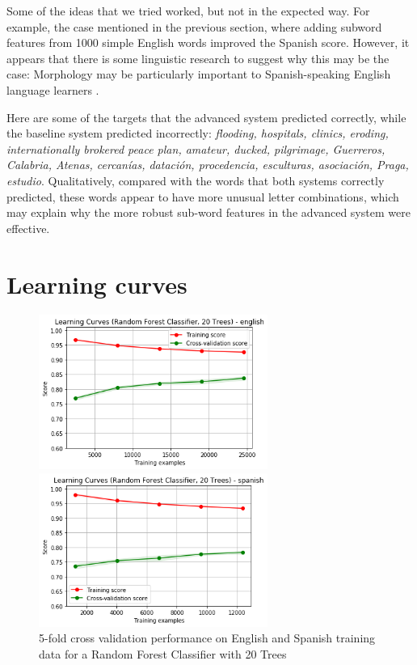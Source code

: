 \documentclass[11pt,a4paper]{article}
\begin{document}
Some of the ideas that we tried worked, but not in the expected way. For example, the case mentioned in the previous section, where adding subword features from 1000 simple English words improved the Spanish score. However, it appears that there is some linguistic research to suggest why this may be the case: Morphology may be particularly important to Spanish-speaking English language learners \cite{ramirez2010morphological}.

Here are some of the targets that the advanced system predicted correctly, while the baseline system predicted incorrectly: \emph{flooding, hospitals, clinics, eroding, internationally brokered peace plan, amateur, ducked, pilgrimage, Guerreros, Calabria, Atenas, cercanías, datación, procedencia, esculturas, asociación, Praga, estudio}. Qualitatively, compared with the words that both systems correctly predicted, these words appear to have more unusual letter combinations, which may explain why the more robust sub-word features in the advanced system were effective.

\section{Learning curves}

\begin{figure}[h]
\begin{minipage}[b]{1.0\linewidth}
  \centering
  \centerline{\includegraphics[width=7.5cm]{images/RFCEng}}
\end{minipage}
\begin{minipage}[b]{1.0\linewidth}
  \centering
  \centerline{\includegraphics[width=7.5cm]{images/RFCSp}}
\end{minipage}
\caption{5-fold cross validation performance on English and Spanish training data for a Random Forest Classifier with 20 Trees}
\label{fig:RFC}
\end{figure}
\end{document}
